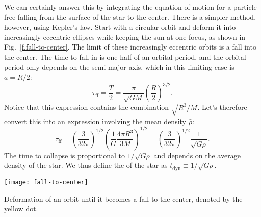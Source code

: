  We can certainly answer this by integrating the equation of motion for a particle free-falling from the surface of the star to the center. There is a simpler method, however, using Kepler's law. Start with a circular orbit and deform it into increasingly eccentric ellipses while keeping the sun at one focus, as shown in Fig.~\ref{f.fall-to-center}.
The limit of these increasingly eccentric orbits is a fall into the center.  The time to fall in is one-half of an orbital period, and the orbital period only depends on the semi-major axis, which in this limiting case is $a = R/2$:
\[
\tau_{\mathrm{ff}} = \frac{T}{2} = \frac{\pi}{\sqrt{GM}} \left(\frac{R}{2}\right)^{3/2}.
\]
Notice that this expression contains the combination $\sqrt{R^{3}/M}$. Let's therefore convert this into an expression involving the mean density $\bar{\rho}$:
\begin{equation}\label{e.tff}
\tau_{\mathrm{ff}} = \left(\frac{3}{32\pi}\right)^{1/2}\left(\frac{1}{G}\frac{4\pi R^{3}}{3M}\right)^{1/2} = \left(\frac{3}{32\pi}\right)^{1/2} \frac{1}{\sqrt{G\bar{\rho}}}.
\end{equation}
The time to collapse is proportional to $1/\sqrt{G\bar{\rho}}$ and depends on the average density of the star. We thus define the  of the star as $t_{\mathrm{dyn}} \equiv 1/\sqrt{G\bar{\rho}}$.

\begin{marginfigure}
\texttt{[image: fall-to-center]}
\caption[Fall to center]{\label{f.fall-to-center} Deformation of an orbit until it becomes a fall to the center, denoted by the yellow dot.}
\end{marginfigure}

